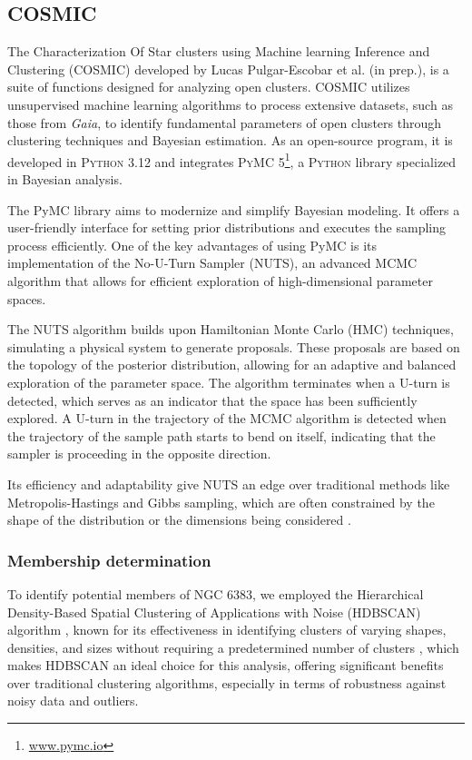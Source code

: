 \documentclass{aa}
\begin{document}
\subsection{\textsc{COSMIC}}
The Characterization Of Star clusters using Machine learning Inference and Clustering (\textsc{COSMIC}) developed by Lucas Pulgar-Escobar et al. (in prep.), is a suite of functions designed for analyzing open clusters. COSMIC utilizes unsupervised machine learning algorithms to process extensive datasets, such as those from \textit{Gaia}, to identify fundamental parameters of open clusters through clustering techniques and Bayesian estimation. As an open-source program, it is developed in \textsc{Python} 3.12 and integrates \textsc{PyMC} 5\footnote{\href{www.pymc.io}{www.pymc.io}}, a \textsc{Python} library specialized in Bayesian analysis.

The PyMC library aims to modernize and simplify Bayesian modeling. It offers a user-friendly interface for setting prior distributions and executes the sampling process efficiently. One of the key advantages of using PyMC is its implementation of the No-U-Turn Sampler (NUTS), an advanced MCMC algorithm that allows for efficient exploration of high-dimensional parameter spaces.

The NUTS algorithm builds upon Hamiltonian Monte Carlo (HMC) techniques, simulating a physical system to generate proposals. These proposals are based on the topology of the posterior distribution, allowing for an adaptive and balanced exploration of the parameter space. The algorithm terminates when a U-turn is detected, which serves as an indicator that the space has been sufficiently explored. A U-turn in the trajectory of the MCMC algorithm is detected when the trajectory of the sample path starts to bend on itself, indicating that the sampler is proceeding in the opposite direction.

Its efficiency and adaptability give NUTS an edge over traditional methods like Metropolis-Hastings and Gibbs sampling, which are often constrained by the shape of the distribution or the dimensions being considered \citep{phan2019composable}.

\subsubsection{Membership determination}\label{subsubsec:membership}

To identify potential members of NGC 6383, we employed the Hierarchical Density-Based Spatial Clustering of Applications with Noise (\textsc{HDBSCAN}) algorithm \citep{10.1007/978-3-642-37456-2_14,McInnes2017}, known for its effectiveness in identifying clusters of varying shapes, densities, and sizes without requiring a predetermined number of clusters \citep{2021A&A...646A.104H}, which makes \textsc{HDBSCAN} an ideal choice for this analysis, offering significant benefits over traditional clustering algorithms, especially in terms of robustness against noisy data and outliers.
\end{document}
